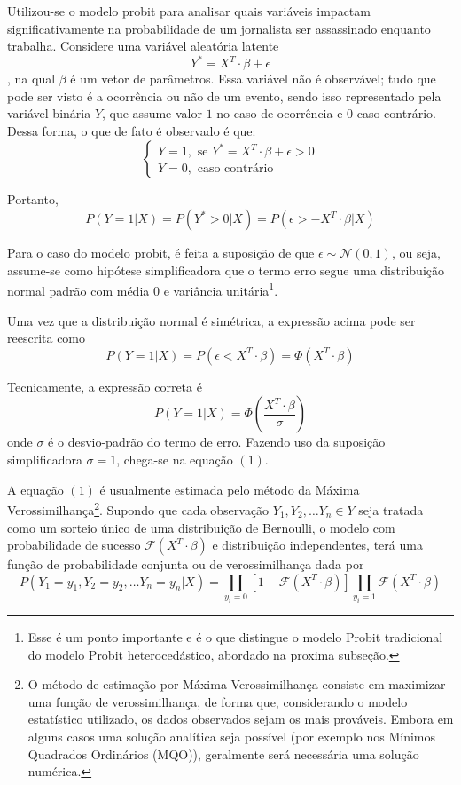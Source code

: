 \documentclass[12pt,
               openright,
               oneside,
               a4paper,
							 section=TITLE,     %
               subsection=Title,  %
               english,brazil]{article}
\begin{document}
Utilizou-se o modelo probit para analisar quais variáveis impactam significativamente na probabilidade de um jornalista ser assassinado enquanto trabalha. Considere uma variável aleatória latente
$$
Y^* = X^{T} \cdot \beta + \epsilon
$$
, na qual $\beta$ é um vetor de parâmetros. Essa variável não é observável; tudo que pode ser visto é a ocorrência ou não de um evento, sendo isso representado pela variável binária $Y$, que assume valor $1$ no caso de ocorrência e $0$ caso contrário.  Dessa forma, o que de fato é observado é que:
$$
\begin{cases}
Y = 1, \text{ se } Y^* = X^T \cdot \beta + \epsilon > 0 \\
Y = 0, \text{ caso contrário}
\end{cases}
$$

Portanto,
$$
P(Y = 1 | X) = P(Y^* > 0 | X) = P(\epsilon > -X^T \cdot \beta | X)
$$

Para o caso do modelo probit, é feita a suposição de que $\epsilon \sim \mathcal{N}(0, 1)$, ou seja, assume-se como hipótese simplificadora que o termo erro segue uma distribuição normal padrão com média $0$ e variância unitária\footnote[3]{Esse é um ponto importante e é o que distingue o modelo Probit tradicional do modelo Probit heterocedástico, abordado na proxima subseção.}. 

Uma vez que a distribuição normal é simétrica, a expressão acima pode ser reescrita como
\begin{equation}
P(Y = 1 | X) = P(\epsilon < X^T \cdot \beta) = \Phi(X^T \cdot \beta)    
\end{equation}

Tecnicamente, a expressão correta é
$$
P(Y = 1 | X) = \Phi \left( \frac{X^T \cdot \beta}{\sigma} \right)
$$
onde $\sigma$ é o desvio-padrão do termo de erro. Fazendo uso da suposição simplificadora $\sigma = 1$, chega-se na equação $(1)$.

A equação $(1)$ é usualmente estimada pelo método da Máxima Verossimilhança\footnote[4]{O método de estimação por Máxima Verossimilhança consiste em maximizar uma função de verossimilhança, de forma que, considerando o modelo estatístico utilizado, os dados observados sejam os mais prováveis. Embora em alguns casos uma solução analítica seja possível (por exemplo nos Mínimos Quadrados Ordinários (MQO)), geralmente será necessária uma solução numérica. }. Supondo que cada observação $Y_1, Y_2, \dots Y_n \in Y$ seja tratada como um sorteio único de uma distribuição de Bernoulli, o modelo com probabilidade de sucesso $\mathcal{F}(X^T \cdot \beta)$ e distribuição independentes, terá uma função de probabilidade conjunta ou de verossimilhança dada por
\begin{equation}
    P(Y_1 = y_1, Y_2 = y_2, \dots Y_n = y_n | X) = \prod_{y_i=0}[1-\mathcal{F}(X^T \cdot \beta)] \prod_{y_i=1}\mathcal{F}(X^T \cdot \beta)
\end{equation}
\end{document}
